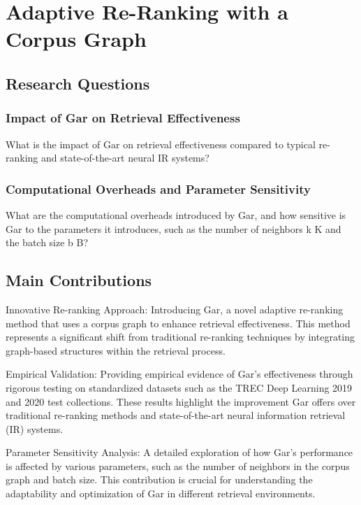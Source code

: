 \documentclass[sigconf,authorversion,nonacm]{acmart}
\begin{document}
\section{Adaptive Re-Ranking with a Corpus Graph}

\subsection{Research Questions}

\subsubsection{Impact of Gar on Retrieval Effectiveness}

What is the impact of Gar on retrieval effectiveness compared to typical re-ranking and
state-of-the-art neural IR systems?

\subsubsection{Computational Overheads and Parameter Sensitivity}

What are the computational overheads introduced by Gar, and how sensitive is Gar to the parameters
it introduces, such as the number of neighbors k K and the batch size b B?

\subsection{Main Contributions}

Innovative Re-ranking Approach: Introducing Gar, a novel adaptive re-ranking method that uses a
corpus graph to enhance retrieval effectiveness. This method represents a significant shift from
traditional re-ranking techniques by integrating graph-based structures within the retrieval
process.

Empirical Validation: Providing empirical evidence of Gar's effectiveness through rigorous testing
on standardized datasets such as the TREC Deep Learning 2019 and 2020 test collections. These
results highlight the improvement Gar offers over traditional re-ranking methods and
state-of-the-art neural information retrieval (IR) systems.

Parameter Sensitivity Analysis: A detailed exploration of how Gar's performance is affected by
various parameters, such as the number of neighbors in the corpus graph and batch size. This
contribution is crucial for understanding the adaptability and optimization of Gar in different
retrieval environments.
\end{document}
